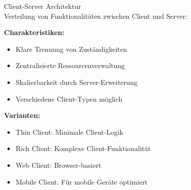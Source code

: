 \begin{concept}{Client-Server Architektur}\\
Verteilung von Funktionalitäten zwischen Client und Server:

\textbf{Charakteristiken:}
\begin{itemize}
    \item Klare Trennung von Zuständigkeiten
    \item Zentralisierte Ressourcenverwaltung
    \item Skalierbarkeit durch Server-Erweiterung
    \item Verschiedene Client-Typen möglich
\end{itemize}

\textbf{Varianten:}
\begin{itemize}
    \item Thin Client: Minimale Client-Logik
    \item Rich Client: Komplexe Client-Funktionalität
    \item Web Client: Browser-basiert
    \item Mobile Client: Für mobile Geräte optimiert
\end{itemize}
\end{concept}



